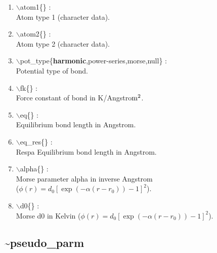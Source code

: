 \documentclass[12pt]{article}
\begin{document}
\begin{enumerate}

 \vspace{0.15in} 
 \item  $\backslash$atom1\{\} : \\
    Atom type 1 (character data).
   
 \vspace{0.15in} 
 \item  $\backslash$atom2\{\} : \\ 
    Atom type 2 (character data).

 \vspace{0.15in} 
 \item  $\backslash$pot\_type\{{\bf harmonic},power-series,morse,null\} : \\
     Potential type of bond.

 \vspace{0.15in} 
 \item  $\backslash$fk\{\} : \\
     Force constant of bond in K/Angstro${\rm m}^2$.

 \vspace{0.15in} 
 \item  $\backslash$eq\{\} : \\
    Equilibrium bond length in Angstrom.

 \vspace{0.15in} 
 \item  $\backslash$eq\_res\{\} : \\
     Respa Equilibrium bond length in Angstrom.

 \vspace{0.15in} 
 \item  $\backslash$alpha\{\} : \\
    Morse parameter alpha in inverse Angstrom \\
    ($\phi(r) = d_0[\exp(-\alpha(r-r_0))-1]^2$).

 \vspace{0.15in} 
 \item  $\backslash$d0\{\} : \\
    Morse d0 in Kelvin
    ($\phi(r) = d_0[\exp(-\alpha(r-r_0))-1]^2$).

\end{enumerate}

\newpage
\subsection*{\bf \~{}pseudo\_parm}
\end{document}

